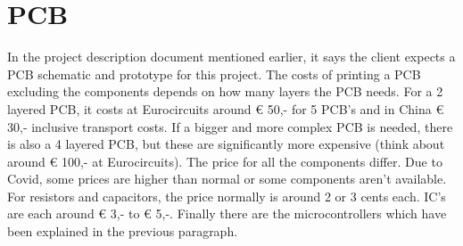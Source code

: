 \section{PCB}
\justify
In the project description document mentioned earlier, it says the client expects a PCB schematic and prototype for this project. The costs of printing a PCB excluding the components depends on how many layers the PCB needs. For a 2 layered PCB, it costs at Eurocircuits around € 50,- for 5 PCB’s and in China € 30,- inclusive transport costs. If a bigger and more complex PCB is needed, there is also a 4 layered PCB, but these are significantly more expensive (think about around € 100,- at Eurocircuits).  The price for all the components differ. Due to Covid, some prices are higher than normal or some components aren’t available. For resistors and capacitors, the price normally is around 2 or 3 cents each. IC’s are each around € 3,- to € 5,-. Finally there are the microcontrollers which have been explained in the previous paragraph. 
